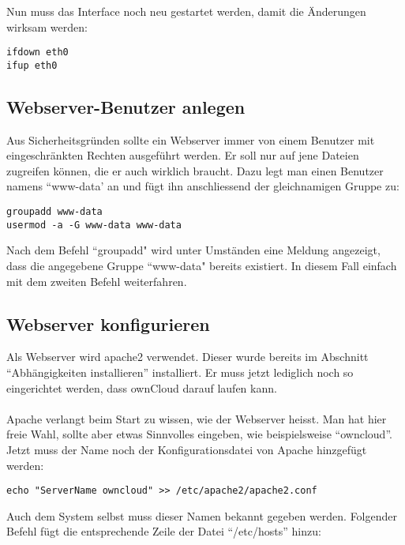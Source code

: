 Nun muss das Interface noch neu gestartet werden, damit die Änderungen wirksam werden:
\\

\begin{lstlisting}
ifdown eth0
ifup eth0
\end{lstlisting}

\subsection{Webserver-Benutzer anlegen}
Aus Sicherheitsgründen sollte ein Webserver immer von einem Benutzer mit eingeschränkten Rechten ausgeführt werden. Er soll nur auf jene Dateien zugreifen können, die er auch wirklich braucht. Dazu legt man einen Benutzer namens ``www-data' an und fügt ihn anschliessend der gleichnamigen Gruppe zu:
\\

\begin{lstlisting}
groupadd www-data
usermod -a -G www-data www-data
\end{lstlisting}

Nach dem Befehl ``groupadd" wird unter Umständen eine Meldung angezeigt, dass die angegebene Gruppe ``www-data" bereits existiert. In diesem Fall einfach mit dem zweiten Befehl weiterfahren.

\subsection{Webserver konfigurieren}
Als Webserver wird apache2 verwendet. Dieser wurde bereits im Abschnitt ``Abhängigkeiten installieren'' installiert. Er muss jetzt lediglich noch so eingerichtet werden, 
dass ownCloud darauf laufen kann.
\\
\\
Apache verlangt beim Start zu wissen, wie der Webserver heisst. Man hat hier freie Wahl, sollte aber etwas Sinnvolles eingeben, wie beispielsweise ``owncloud''.
\\
Jetzt muss der Name noch der Konfigurationsdatei von Apache hinzgefügt werden:
\\

\begin{lstlisting}
echo "ServerName owncloud" >> /etc/apache2/apache2.conf
\end{lstlisting}

Auch dem System selbst muss dieser Namen bekannt gegeben werden. Folgender Befehl fügt die entsprechende Zeile der Datei ``/etc/hosts'' hinzu:
\\

